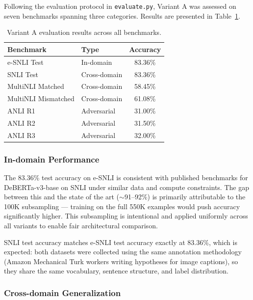 Following the evaluation protocol in \texttt{evaluate.py}, Variant A
was assessed on seven benchmarks spanning three categories. Results are
presented in Table~\ref{tab:eval_results}.

\begin{table}[H]
\centering
\caption{Variant A evaluation results across all benchmarks.}
\label{tab:eval_results}
\begin{tabular}{llc}
\toprule
\textbf{Benchmark}   & \textbf{Type}   & \textbf{Accuracy} \\
\midrule
e-SNLI Test          & In-domain       & 83.36\% \\
SNLI Test            & Cross-domain    & 83.36\% \\
MultiNLI Matched     & Cross-domain    & 58.45\% \\
MultiNLI Mismatched  & Cross-domain    & 61.08\% \\
ANLI R1              & Adversarial     & 31.00\% \\
ANLI R2              & Adversarial     & 31.50\% \\
ANLI R3              & Adversarial     & 32.00\% \\
\bottomrule
\end{tabular}
\end{table}

\subsubsection{In-domain Performance}

The 83.36\% test accuracy on e-SNLI is consistent with published
benchmarks for DeBERTa-v3-base on SNLI under similar data and compute
constraints. The gap between this and the state of the art
($\sim$91--92\%) is primarily attributable to the 100K subsampling ---
training on the full 550K examples would push accuracy significantly
higher. This subsampling is intentional and applied uniformly across
all variants to enable fair architectural comparison.

SNLI test accuracy matches e-SNLI test accuracy exactly at 83.36\%,
which is expected: both datasets were collected using the same
annotation methodology (Amazon Mechanical Turk workers writing
hypotheses for image captions), so they share the same vocabulary,
sentence structure, and label distribution.

\subsubsection{Cross-domain Generalization}

